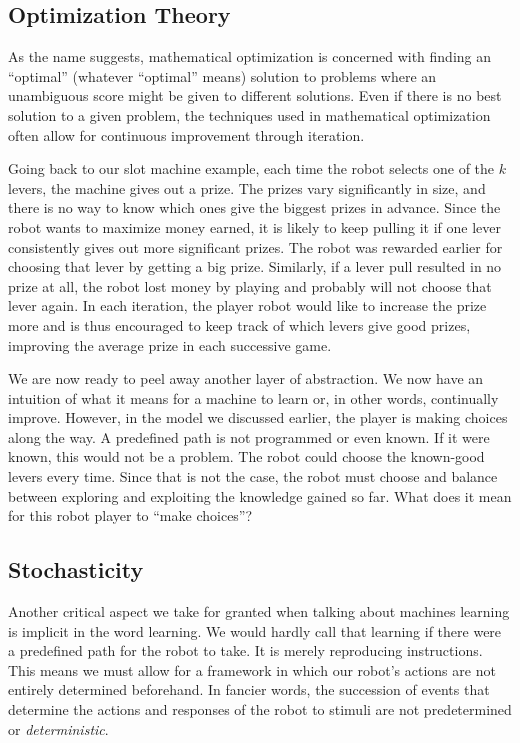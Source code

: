 \subsection{Optimization Theory}
As the name suggests, mathematical optimization
is concerned with finding an ``optimal'' (whatever ``optimal'' means) solution
to problems where an unambiguous score might be given to different solutions.
Even if there is no best solution to a given problem, the techniques used in
mathematical optimization often allow for continuous improvement through
iteration.

Going back to our slot machine example, each time the robot selects one of the
$k$ levers, the machine gives out a prize. The prizes vary significantly in
size, and there is no way to know which ones give the biggest prizes in advance.
Since the robot wants to maximize money earned, it is likely to keep pulling it
if one lever consistently gives out more significant prizes. The robot was
rewarded earlier for choosing that lever by getting a big prize. Similarly, if a
lever pull resulted in no prize at all, the robot lost money by playing and
probably will not choose that lever again. In each iteration, the player robot
would like to increase the prize more and is thus encouraged to keep track of
which levers give good prizes, improving the average prize in each successive
game.

We are now ready to peel away another layer of abstraction. We now have an
intuition of what it means for a machine to learn or, in other words,
continually improve. However, in the model we discussed earlier, the player is
making choices along the way. A predefined path is not programmed or even known.
If it were known, this would not be a problem. The robot could choose the
known-good levers every time. Since that is not the case, the robot must choose
and balance between exploring and exploiting the knowledge gained so far. What
does it mean for this robot player to ``make choices''?

\subsection{Stochasticity}
Another critical aspect we take for granted when
talking about machines learning is implicit in the word learning. We would
hardly call that learning if there were a predefined path for the robot to take.
It is merely reproducing instructions. This means we must allow for a framework
in which our robot's actions are not entirely determined beforehand. In fancier
words, the succession of events that determine the actions and responses of the
robot to stimuli are not predetermined or \textit{deterministic}.

